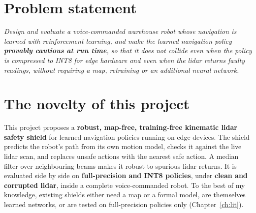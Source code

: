 \documentclass[12pt,a4paper,oneside]{report}
\begin{document}
\section{Problem statement}
\emph{Design and evaluate a voice-commanded warehouse robot whose navigation is learned with reinforcement learning,
and make the learned navigation policy \textbf{provably cautious at run time}, so that it does not collide even when
the policy is compressed to INT8 for edge hardware and even when the lidar returns faulty readings, without
requiring a map, retraining or an additional neural network.}

\section{The novelty of this project}
\begin{tcolorbox}[novelty,title=\textbf{Novelty in one paragraph}]
This project proposes a \textbf{robust, map-free, training-free kinematic lidar safety shield} for learned navigation
policies running on edge devices. The shield predicts the robot's path from its own motion model, checks it against
the live lidar scan, and replaces unsafe actions with the nearest safe action. A median filter over neighbouring
beams makes it robust to spurious lidar returns. It is evaluated side by side on \textbf{full-precision and INT8
policies}, under \textbf{clean and corrupted lidar}, inside a complete voice-commanded robot. To the best of my
knowledge, existing shields either need a map or a formal model, are themselves learned networks, or are tested on
full-precision policies only (Chapter~\ref{ch:lit}).
\end{tcolorbox}
\end{document}
